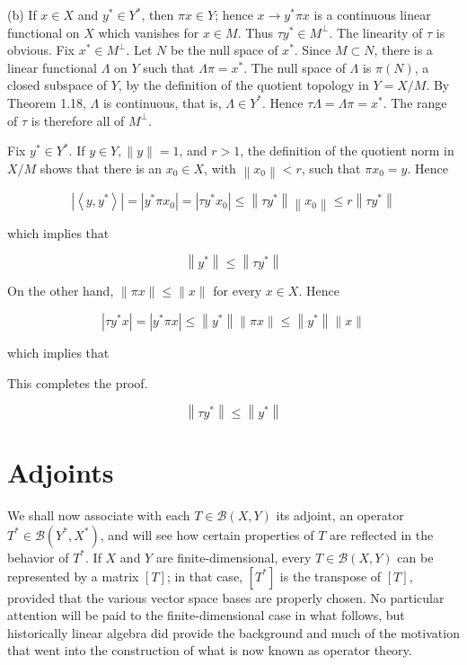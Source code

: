 \documentclass[10pt]{article}
\begin{document}
(b) If $x \in X$ and $y^{*} \in Y^{*}$, then $\pi x \in Y$; hence $x \rightarrow y^{*} \pi x$ is a continuous linear functional on $X$ which vanishes for $x \in M$. Thus $\tau y^{*} \in M^{\perp}$. The linearity of $\tau$ is obvious. Fix $x^{*} \in M^{\perp}$. Let $N$ be the null space of $x^{*}$. Since $M \subset N$, there is a linear functional $\Lambda$ on $Y$ such that $\Lambda \pi=x^{*}$. The null space of $\Lambda$ is $\pi(N)$, a closed subspace of $Y$, by the definition of the quotient topology in $Y=X / M$. By Theorem 1.18, $\Lambda$ is continuous, that is, $\Lambda \in Y^{*}$. Hence $\tau \Lambda=\Lambda \pi=x^{*}$. The range of $\tau$ is therefore all of $M^{\perp}$.

Fix $y^{*} \in Y^{*}$. If $y \in Y,\|y\|=1$, and $r>1$, the definition of the quotient norm in $X / M$ shows that there is an $x_{0} \in X$, with $\left\|x_{0}\right\|<r$, such that $\pi x_{0}=y$. Hence

$$
\left|\left\langle y, y^{*}\right\rangle\right|=\left|y^{*} \pi x_{0}\right|=\left|\tau y^{*} x_{0}\right| \leq\left\|\tau y^{*}\right\|\left\|x_{0}\right\| \leq r\left\|\tau y^{*}\right\|
$$

which implies that

$$
\left\|y^{*}\right\| \leq\left\|\tau y^{*}\right\|
$$

On the other hand, $\|\pi x\| \leq\|x\|$ for every $x \in X$. Hence

$$
\left|\tau y^{*} x\right|=\left|y^{*} \pi x\right| \leq\left\|y^{*}\right\|\|\pi x\| \leq\left\|y^{*}\right\|\|x\|
$$

which implies that

This completes the proof.

$$
\left\|\tau y^{*}\right\| \leq\left\|y^{*}\right\|
$$

\section{Adjoints}
We shall now associate with each $T \in \mathscr{B}(X, Y)$ its adjoint, an operator $T^{*} \in \mathscr{B}\left(Y^{*}, X^{*}\right)$, and will see how certain properties of $T$ are reflected in the behavior of $T^{*}$. If $X$ and $Y$ are finite-dimensional, every $T \in \mathscr{B}(X, Y)$ can be represented by a matrix $[T]$; in that
case, $\left[T^{*}\right]$ is the transpose of $[T]$, provided that the various vector space bases are properly chosen. No particular attention will be paid to the finite-dimensional case in what follows, but historically linear algebra did provide the background and much of the motivation that went into the construction of what is now known as operator theory.
\end{document}
